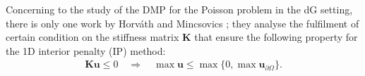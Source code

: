 Concerning to the study of the DMP for the Poisson problem in the dG setting, there is {only} one work by Horv\'ath and Mincsovics \cite{horvath_discrete_2013}; they analyse the fulfilment of certain condition on the stiffness matrix $\mathbf{K}$ that ensure the following property for the 1D interior penalty (IP) method:
\begin{align*}
\mathbf{Ku}\leq 0 \quad \Longrightarrow   \quad \max \mathbf{u} \leq \max\{0,\max \mathbf{u}_{\partial \Omega}\}. 
\end{align*} 